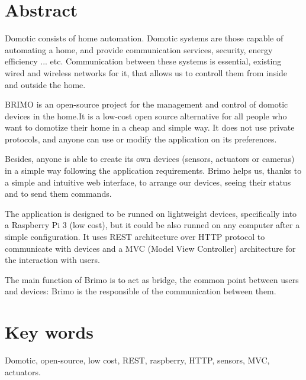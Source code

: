 \section*{Abstract}
Domotic consists of home automation. Domotic systems are those capable of automating a home, and provide communication services,
security, energy efficiency ... etc. Communication between these systems is essential, existing wired and wireless networks for it,
that allows us to controll them from inside and outside the home.

BRIMO is an open-source project for the management and control of domotic devices in the home.It is a low-cost open source alternative for all people
 who want to domotize their home in a cheap and simple way. It does not use private protocols, and anyone can use or modify the application on its preferences.

Besides, anyone is able to create its own devices (sensors, actuators or cameras) in a simple way following the application requirements. Brimo helps us, thanks to
a simple and intuitive web interface, to arrange our devices, seeing their status and to send them commands.

The application is designed to be runned on lightweight devices, specifically into a Raspberry Pi 3 (low cost), but it could be also runned on any computer after a simple
configuration. It uses REST architecture over HTTP protocol to communicate with devices and a MVC (Model View Controller) architecture for the interaction with users.

The main function of Brimo is to act as bridge, the common point between users and devices: Brimo is the responsible of the communication between them.
\section*{Key words}

Domotic, open-source, low cost, REST, raspberry, HTTP, sensors, MVC, actuators.